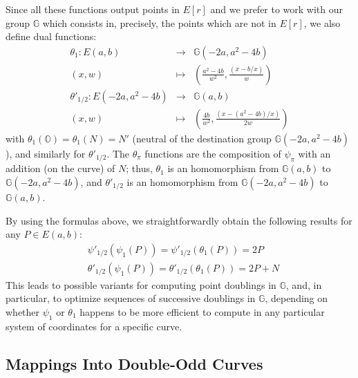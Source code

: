 \documentclass{llncs}
\newcommand{\bG}{\mathbb{G}}
\newcommand{\neutral}{\mathbb{O}}
\begin{document}
Since all these functions output points in $E[r]$ and we prefer to work
with our group $\bG$ which consists in, precisely, the points which are
not in $E[r]$, we also define dual functions:
\begin{eqnarray*}
    \theta_1 : E(a, b) &\longrightarrow& \bG(-2a, a^2-4b) \\
    (x, w) &\longmapsto& \left(\frac{a^2-4b}{w^2}, \frac{(x - b/x)}{w}\right) \\
    \theta'_{1/2} : E(-2a, a^2-4b) &\longrightarrow& \bG(a, b) \\
    (x, w) &\longmapsto& \left(\frac{4b}{w^2}, \frac{(x - (a^2-4b)/x)}{2w}\right)
\end{eqnarray*}
with $\theta_1(\neutral) = \theta_1(N) = N'$ (neutral of the destination
group $\bG(-2a, a^2-4b)$), and similarly for $\theta'_{1/2}$. The
$\theta_\pi$ functions are the composition of $\psi_\pi$ with an
addition (on the curve) of $N$; thus, $\theta_1$ is an homomorphism from
$\bG(a,b)$ to $\bG(-2a, a^2-4b)$, and $\theta'_{1/2}$ is an homomorphism
from $\bG(-2a, a^2-4b)$ to $\bG(a, b)$.

By using the formulas above, we straightforwardly obtain the following
results for any $P \in E(a, b)$:
\begin{align*}
    &\psi'_{1/2}(\psi_1(P)) = \psi'_{1/2}(\theta_1(P)) = 2P \\
    &\theta'_{1/2}(\psi_1(P)) = \theta'_{1/2}(\theta_1(P)) = 2P+N
\end{align*}
This leads to possible variants for computing point doublings in $\bG$,
and, in particular, to optimize sequences of successive doublings in
$\bG$, depending on whether $\psi_1$ or $\theta_1$ happens to be more
efficient to compute in any particular system of coordinates for a
specific curve.

\subsection{Mappings Into Double-Odd Curves}\label{sec:formulas:mappings}
\end{document}
